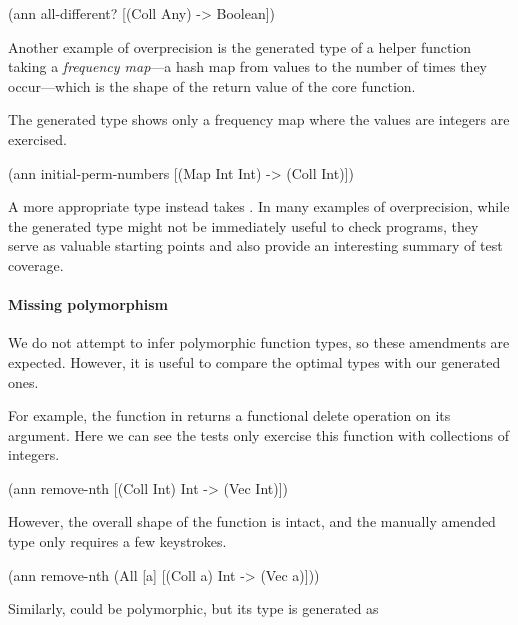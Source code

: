 \begin{cljlisting}
(ann all-different? [(Coll Any) -> Boolean])
\end{cljlisting}

Another example of overprecision is the generated type
of  a helper function
taking a \emph{frequency map}---a hash map from values
to the number of times they occur---which is the shape
of the return value of the core 
function.

The generated type shows only a frequency map where
the values are integers are exercised.
%
\begin{cljlisting}
(ann initial-perm-numbers
  [(Map Int Int) -> (Coll Int)])
\end{cljlisting}
%
A more appropriate type instead takes .
%
%
In many examples of overprecision, while the generated
type might not be immediately useful to check programs,
they serve as valuable starting points and also provide
an interesting summary of test coverage.

\paragraph{Missing polymorphism}

We do not attempt to infer polymorphic function types, 
so these amendments are expected. However, it is useful
to compare the optimal types with our generated ones.

For example, the  function in 
returns a functional delete operation on its argument.
Here we can see the tests only exercise this function with
collections of integers.

\begin{cljlisting}
(ann remove-nth [(Coll Int) Int -> (Vec Int)])
\end{cljlisting}

However, the overall shape of the function is intact,
and the manually amended type only requires a few 
keystrokes.

\begin{cljlisting}
(ann remove-nth
  (All [a] [(Coll a) Int -> (Vec a)]))
\end{cljlisting}

Similarly,  could be polymorphic, 
but its type is generated as

